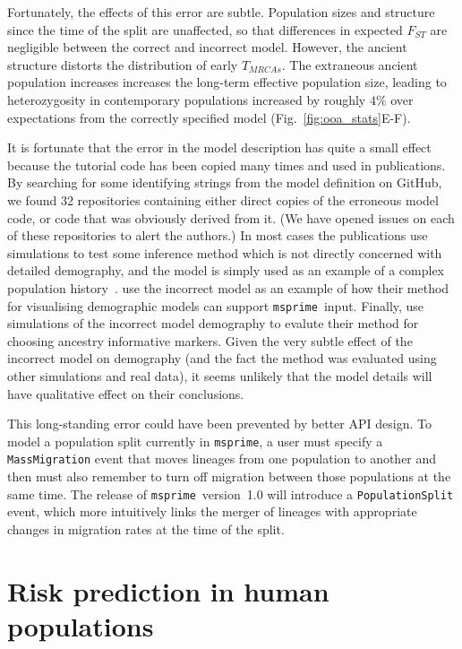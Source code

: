 \documentclass{article}
\newcommand{\msprime}[0]{\texttt{msprime}}
\begin{document}
Fortunately, the effects of this error are subtle.
Population sizes and structure since the time of
the split are unaffected, so that differences in expected $F_{ST}$ are negligible between
the correct and incorrect model. However, the ancient structure distorts the distribution
of early $T_{MRCAs}$. The extraneous ancient population increases increases the long-term effective 
population size, leading to heterozygosity in contemporary populations
increased by roughly $4\%$ over expectations from the correctly specified 
model (Fig.~\ref{fig:ooa_stats}E-F).

It is fortunate that the error in the model description has quite a
small effect because the tutorial code has been copied many times
and used in publications. By searching for some identifying strings
from the model definition on GitHub,
we found 32 repositories containing either direct copies of the
erroneous model code, or code that was obviously derived from it.
(We have opened issues on each of these repositories to alert the authors.)
In most cases the publications use simulations to test some inference
method which is not directly concerned with detailed demography,
and the model is simply used as an example of a complex population
history~\citep{kelleher2019inferring,albers2020dating,tong2020population}.
\cite{zhou2018popdemog} use the incorrect model as an example
of how their method for visualising demographic models can support
\msprime\ input.
Finally, \cite{pfaffelhuber2020choose}
use simulations of the incorrect model demography to evalute
their method for choosing ancestry informative markers.
Given the very subtle effect of the incorrect
model on demography (and the fact the method was evaluated using other
simulations and real data), it seems unlikely that the model details
will have qualitative effect on their conclusions.

This long-standing error could have been prevented by better API design.
To model a population split currently in \msprime, a user must specify a
\texttt{MassMigration} event that moves lineages from one population to another
and then must also remember to turn off migration
between those populations at the same time.
The release of \msprime\ version~1.0 will introduce a \texttt{PopulationSplit} event,
which more intuitively links the merger of lineages with appropriate changes in
migration rates at the time of the split.

\section{Risk prediction in human populations}
\end{document}
